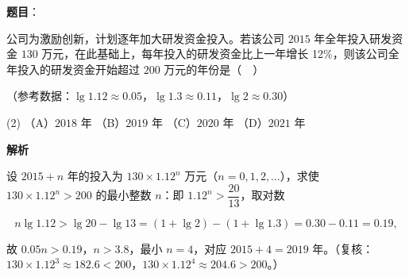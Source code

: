 \begin{answer}

\textbf{题目}：

公司为激励创新，计划逐年加大研发资金投入。若该公司 \(2015\) 年全年投入研发资金 \(130\) 万元，在此基础上，每年投入的研发资金比上一年增长 12\%，则该公司全年投入的研发资金开始超过 \(200\) 万元的年份是（　）

（参考数据：\(\lg 1.12\approx 0.05\)，\(\lg 1.3\approx 0.11\)，\(\lg 2\approx 0.30\)）

\begin{gkopts}(2)
\task （A）\(2018\) 年
\task （B）\(2019\) 年
\task （C）\(2020\) 年
\task （D）\(2021\) 年
\end{gkopts}

\textbf{解析}

设 \(2015+n\) 年的投入为 \(130\times1.12^{n}\) 万元（\(n=0,1,2,\dots\)），求使 \(130\times1.12^{n}>200\) 的最小整数 \(n\)：即 \(1.12^{n}>\dfrac{20}{13}\)，取对数

\nopagebreak[4]
\[
n\lg 1.12>\lg 20-\lg 13=(1+\lg 2)-(1+\lg 1.3)=0.30-0.11=0.19,
\]

故 \(0.05n>0.19\)，\(n>3.8\)，最小 \(n=4\)，对应 \(2015+4=2019\) 年。（复核：\(130\times1.12^{3}\approx182.6<200\)，\(130\times1.12^{4}\approx204.6>200\)。）


\end{answer}
